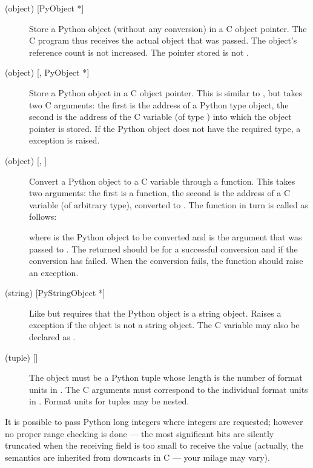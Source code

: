 \documentclass{manual}
\begin{document}
\begin{description}
\item[ (object) {[PyObject *]}]
Store a Python object (without any conversion) in a C object pointer.
The C program thus receives the actual object that was passed.  The
object's reference count is not increased.  The pointer stored is not
\NULL{}.

\item[ (object) {[, PyObject *]}]
Store a Python object in a C object pointer.  This is similar to
, but takes two C arguments: the first is the address of a
Python type object, the second is the address of the C variable (of
type ) into which the object pointer is stored.
If the Python object does not have the required type, a
 exception is raised.

\item[ (object) {[, ]}]
Convert a Python object to a C variable through a 
function.  This takes two arguments: the first is a function, the
second is the address of a C variable (of arbitrary type), converted
to .  The  function in turn is called as
follows:


where  is the Python object to be converted and
 is the  argument that was passed to
.  The returned  should be
 for a successful conversion and  if the conversion
has failed.  When the conversion fails, the  function
should raise an exception.

\item[ (string) {[PyStringObject *]}]
Like  but requires that the Python object is a string object.
Raises a  exception if the object is not a string
object.  The C variable may also be declared as .

\item[ (tuple) {[]}]
The object must be a Python tuple whose length is the number of format
units in .  The C arguments must correspond to the
individual format units in .  Format units for tuples may
be nested.

\end{description}

It is possible to pass Python long integers where integers are
requested; however no proper range checking is done --- the most
significant bits are silently truncated when the receiving field is
too small to receive the value (actually, the semantics are inherited
from downcasts in C --- your milage may vary).
\end{document}
